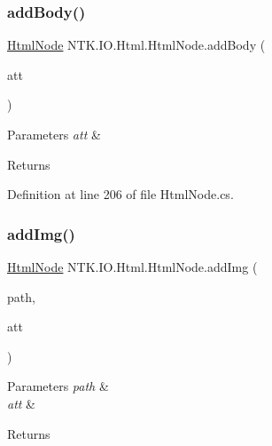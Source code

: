 \subsubsection{\texorpdfstring{addBody()}{addBody()}}
{\footnotesize\ttfamily \mbox{\hyperlink{class_n_t_k_1_1_i_o_1_1_html_1_1_html_node}{Html\+Node}} N\+T\+K.\+I\+O.\+Html.\+Html\+Node.\+add\+Body (\begin{DoxyParamCaption}\item[{params \mbox{\hyperlink{class_n_t_k_1_1_i_o_1_1_xml_1_1_xml_attribute}{Xml\+Attribute}} \mbox{[}$\,$\mbox{]}}]{att }\end{DoxyParamCaption})}






\begin{DoxyParams}{Parameters}
{\em att} & \\
\hline
\end{DoxyParams}
\begin{DoxyReturn}{Returns}

\end{DoxyReturn}


Definition at line 206 of file Html\+Node.\+cs.

\mbox{\label{class_n_t_k_1_1_i_o_1_1_html_1_1_html_node_a797c00333d4d4ba57626ffb91fbe8a60}} 
\subsubsection{\texorpdfstring{addImg()}{addImg()}}
{\footnotesize\ttfamily \mbox{\hyperlink{class_n_t_k_1_1_i_o_1_1_html_1_1_html_node}{Html\+Node}} N\+T\+K.\+I\+O.\+Html.\+Html\+Node.\+add\+Img (\begin{DoxyParamCaption}\item[{String}]{path,  }\item[{params \mbox{\hyperlink{class_n_t_k_1_1_i_o_1_1_xml_1_1_xml_attribute}{Xml\+Attribute}} \mbox{[}$\,$\mbox{]}}]{att }\end{DoxyParamCaption})}






\begin{DoxyParams}{Parameters}
{\em path} & \\
\hline
{\em att} & \\
\hline
\end{DoxyParams}
\begin{DoxyReturn}{Returns}

\end{DoxyReturn}


